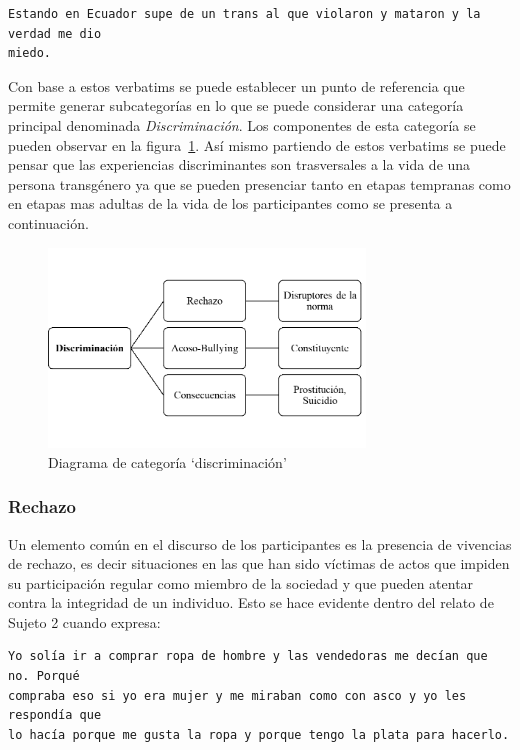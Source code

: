  \begin{verbatim}
Estando en Ecuador supe de un trans al que violaron y mataron y la verdad me dio
miedo.
 \end{verbatim}

Con base a estos verbatims se puede establecer un punto de referencia que
permite generar subcategorías en lo que se puede considerar una categoría
principal denominada \emph{Discriminación}. Los componentes de esta categoría se
pueden observar en la figura~\ref{fig:discriminacion}. Así mismo partiendo de
estos verbatims se puede pensar que las experiencias discriminantes son
trasversales a la vida de una persona transgénero ya que se pueden presenciar
tanto en etapas tempranas como en etapas mas adultas de la vida de los
participantes como se presenta a continuación.

\begin{figure}
    \centering
    \includegraphics[width=0.75\textwidth]{discriminacion}
    \caption{Diagrama de categoría ‘discriminación’}\label{fig:discriminacion}
\end{figure}

\subsubsection{Rechazo}

Un elemento común en el discurso de los participantes es la presencia de
vivencias de rechazo, es decir situaciones en las que han sido víctimas de actos
que impiden su participación regular como miembro de la sociedad y que pueden
atentar contra la integridad de un individuo. Esto se hace evidente dentro del
relato de Sujeto 2 cuando expresa:

\begin{verbatim}
Yo solía ir a comprar ropa de hombre y las vendedoras me decían que no. Porqué
compraba eso si yo era mujer y me miraban como con asco y yo les respondía que
lo hacía porque me gusta la ropa y porque tengo la plata para hacerlo.
\end{verbatim}

